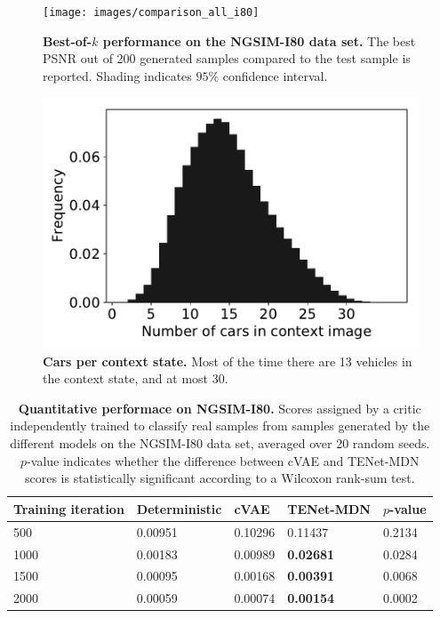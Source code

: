 \documentclass{article}
\begin{document}
\begin{figure}[t!]
  \begin{minipage}[t]{0.49 \textwidth}
    \centering
    \texttt{[image: images/comparison\_all\_i80]}
    \caption{
      \textbf{Best-of-$k$ performance on the NGSIM-I80 data set.}
      The best PSNR out of 200 generated samples compared to the test sample is reported.
      Shading indicates $95\%$ confidence interval.
    }
    \label{best-of-k-i80}
  \end{minipage} \quad%
  \begin{minipage}[t]{0.49 \textwidth}
    \centering
    \includegraphics[width=\textwidth]{images/car_statistics}
    \caption{
      \textbf{Cars per context state.}
      Most of the time there are 13 vehicles in the context state, and at most 30.
    }
    \label{car-statistics}
  \end{minipage}
\end{figure}

\begin{table}[t!]
  \caption{
    \textbf{Quantitative performace on NGSIM-I80.}
    Scores assigned by a critic independently trained to classify real samples from samples generated by the different models on the NGSIM-I80 data set, averaged over 20 random seeds.
    $p$-value indicates whether the difference between cVAE and TENet-MDN scores is statistically significant according to a Wilcoxon rank-sum test.
  }
  \label{critic-table}
  \centering
  \begin{tabular}{l|l|lll}
    \toprule
    Training iteration     & Deterministic & cVAE & TENet-MDN & $p$-value \\
    \midrule
    500 & 0.00951 & 0.10296 & 0.11437 & 0.2134 \\
    1000 & 0.00183 & 0.00989 & \textbf{0.02681} & 0.0284 \\
    1500 & 0.00095 & 0.00168 & \textbf{0.00391} & 0.0068 \\
    2000 & 0.00059 & 0.00074 & \textbf{0.00154} & 0.0002 \\
    \bottomrule
  \end{tabular}
\end{table}
\end{document}
